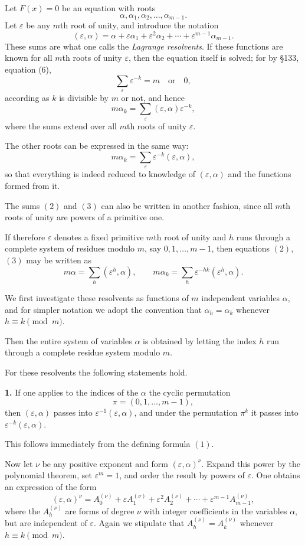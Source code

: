 \documentclass[11pt]{article}
\begin{document}
Let $F(x)=0$ be an equation with roots
\[
\alpha,\alpha_1,\alpha_2,\dots,\alpha_{m-1}.
\]
Let $\varepsilon$ be any $m$th root of unity, and introduce the notation
\[
(\varepsilon,\alpha)=\alpha+\varepsilon\alpha_1+\varepsilon^2\alpha_2+\cdots+\varepsilon^{m-1}\alpha_{m-1}.
\tag{1}
\]
These sums are what one calls the \emph{Lagrange resolvents}. If these functions are known for all $m$th roots of unity $\varepsilon$, then the equation itself is solved; for by \S 133, equation (6),
\[
\sum_{\varepsilon}\varepsilon^{-k}=m \quad\text{or}\quad 0,
\tag{2}
\]
according as $k$ is divisible by $m$ or not, and hence
\[
m\alpha_k=\sum_{\varepsilon}(\varepsilon,\alpha)\varepsilon^{-k},
\tag{3}
\]
where the sums extend over all $m$th roots of unity $\varepsilon$.

The other roots can be expressed in the same way:
\[
m\alpha_k=\sum_{\varepsilon}\varepsilon^{-k}(\varepsilon,\alpha),
\tag{4}
\]
so that everything is indeed reduced to knowledge of $(\varepsilon,\alpha)$ and the functions formed from it.

The sums \((2)\) and \((3)\) can also be written in another fashion, since all $m$th roots of unity are powers of a primitive one.

If therefore $\varepsilon$ denotes a fixed primitive $m$th root of unity and $h$ runs through a complete system of residues modulo $m$, say $0,1,\dots,m-1$, then equations \((2)\), \((3)\) may be written as
\[
m\alpha=\sum_h (\varepsilon^h,\alpha),\qquad
m\alpha_k=\sum_h \varepsilon^{-hk}(\varepsilon^h,\alpha).
\tag{5}
\]

We first investigate these resolvents as functions of $m$ independent variables $\alpha$, and for simpler notation we adopt the convention that $\alpha_h=\alpha_k$ whenever $h\equiv k\pmod m$.

Then the entire system of variables $\alpha$ is obtained by letting the index $h$ run through a complete residue system modulo $m$.

For these resolvents the following statements hold.

\medskip
\noindent\textbf{1.}
If one applies to the indices of the $\alpha$ the cyclic permutation
\[
\pi=(0,1,\dots,m-1),
\]
then $(\varepsilon,\alpha)$ passes into $\varepsilon^{-1}(\varepsilon,\alpha)$, and under the permutation $\pi^k$ it passes into $\varepsilon^{-k}(\varepsilon,\alpha)$.

\medskip
This follows immediately from the defining formula \((1)\).

Now let $\nu$ be any positive exponent and form $(\varepsilon,\alpha)^\nu$. Expand this power by the polynomial theorem, set $\varepsilon^m=1$, and order the result by powers of $\varepsilon$. One obtains an expression of the form
\[
(\varepsilon,\alpha)^\nu
=
A^{(\nu)}_0+\varepsilon A^{(\nu)}_1+\varepsilon^2A^{(\nu)}_2+\cdots+\varepsilon^{m-1}A^{(\nu)}_{m-1},
\tag{5'}
\]
where the $A^{(\nu)}_h$ are forms of degree $\nu$ with integer coefficients in the variables $\alpha$, but are independent of $\varepsilon$.
Again we stipulate that $A^{(\nu)}_h=A^{(\nu)}_k$ whenever $h\equiv k\pmod m$.
\end{document}
